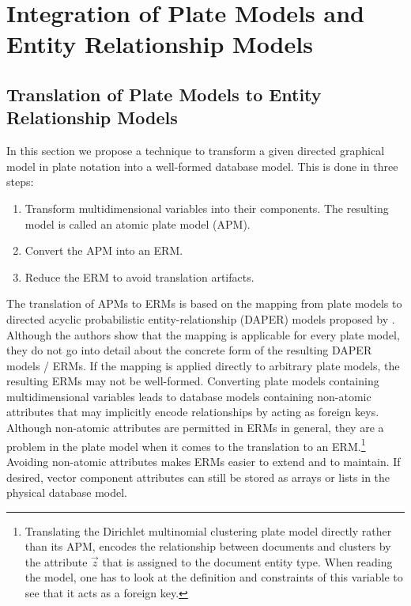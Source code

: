 \section{Integration of Plate Models and Entity Relationship Models}

\subsection{Translation of Plate Models to Entity Relationship Models}
\label{sec:pm2erm}

In this section we propose a technique to transform a given directed graphical model in plate notation into a well-formed database model. This is done in three steps:
\begin{enumerate}
\item Transform multidimensional variables into their components. The resulting model is called an atomic plate model (APM).
\item\label{itm:apm2erm} Convert the APM into an ERM.
\item Reduce the ERM to avoid translation artifacts.
\end{enumerate}
The translation of APMs to ERMs is based on the mapping from plate models to directed acyclic probabilistic entity-relationship (DAPER) models proposed by \textcite{heckerman2007probabilistic}. Although the authors show that the mapping is applicable for every plate model, they do not go into detail about the concrete form of the resulting DAPER models / ERMs. If the mapping is applied directly to arbitrary plate models, the resulting ERMs may not be well-formed. Converting plate models containing multidimensional variables leads to database models containing non-atomic attributes that may implicitly encode relationships by acting as foreign keys. Although non-atomic attributes are permitted in ERMs in general, they are a problem in the plate model when it comes to the translation to an ERM.\footnote{Translating the Dirichlet multinomial clustering plate model directly rather than its APM, encodes the relationship between documents and clusters by the attribute $\vec z$ that is assigned to the document entity type. When reading the model, one has to look at the definition and constraints of this variable to see that it acts as a foreign key.} Avoiding non-atomic attributes makes ERMs easier to extend and to maintain. If desired, vector component attributes can still be stored as arrays or lists in the physical database model.

